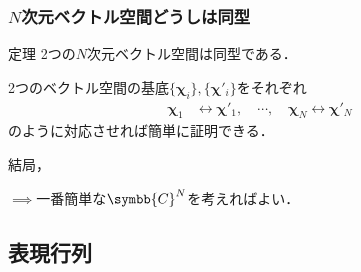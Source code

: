 \documentclass[
    10pt,
    ]{sotsu-beamer}
\begin{document}
\begin{frame}
    \frametitle{$N$次元ベクトル空間どうしは同型}

    \begin{block}{定理}
        2つの$N$次元ベクトル空間は同型である．
    \end{block}

    2つのベクトル空間の基底$\{\symbf{\chi}_i\}, \{\symbf{\chi}'_i\}$をそれぞれ
    \begin{align*}
        \symbf{\chi}_1 &\leftrightarrow \symbf{\chi}'_1, 
        \quad
        \cdots, 
        \quad
        \symbf{\chi}_N \leftrightarrow \symbf{\chi}'_N
    \end{align*}
    のように対応させれば簡単に証明できる．

    \pause 

    結局，

    $\implies$一番簡単な$\symbb{C}^N$を考えればよい．

\end{frame}


\subsection{表現行列}
\end{document}
